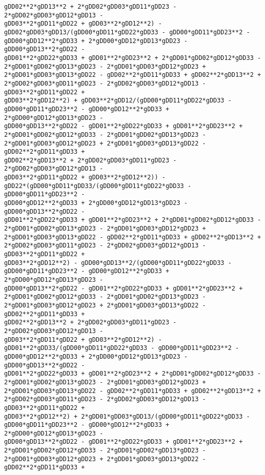 \documentclass[landscape,letterpaper,10pt,english]{article}
\begin{document}
\begin{Verbatim}[commandchars=\\\{\}]
gDD02**2*gDD13**2 + 2*gDD02*gDD03*gDD11*gDD23 - 2*gDD02*gDD03*gDD12*gDD13 -
gDD03**2*gDD11*gDD22 + gDD03**2*gDD12**2) -
gDD02*gDD03*gDD13/(gDD00*gDD11*gDD22*gDD33 - gDD00*gDD11*gDD23**2 -
gDD00*gDD12**2*gDD33 + 2*gDD00*gDD12*gDD13*gDD23 - gDD00*gDD13**2*gDD22 -
gDD01**2*gDD22*gDD33 + gDD01**2*gDD23**2 + 2*gDD01*gDD02*gDD12*gDD33 -
2*gDD01*gDD02*gDD13*gDD23 - 2*gDD01*gDD03*gDD12*gDD23 +
2*gDD01*gDD03*gDD13*gDD22 - gDD02**2*gDD11*gDD33 + gDD02**2*gDD13**2 +
2*gDD02*gDD03*gDD11*gDD23 - 2*gDD02*gDD03*gDD12*gDD13 - gDD03**2*gDD11*gDD22 +
gDD03**2*gDD12**2) + gDD03**2*gDD12/(gDD00*gDD11*gDD22*gDD33 -
gDD00*gDD11*gDD23**2 - gDD00*gDD12**2*gDD33 + 2*gDD00*gDD12*gDD13*gDD23 -
gDD00*gDD13**2*gDD22 - gDD01**2*gDD22*gDD33 + gDD01**2*gDD23**2 +
2*gDD01*gDD02*gDD12*gDD33 - 2*gDD01*gDD02*gDD13*gDD23 -
2*gDD01*gDD03*gDD12*gDD23 + 2*gDD01*gDD03*gDD13*gDD22 - gDD02**2*gDD11*gDD33 +
gDD02**2*gDD13**2 + 2*gDD02*gDD03*gDD11*gDD23 - 2*gDD02*gDD03*gDD12*gDD13 -
gDD03**2*gDD11*gDD22 + gDD03**2*gDD12**2)) -
gDD22*(gDD00*gDD11*gDD33/(gDD00*gDD11*gDD22*gDD33 - gDD00*gDD11*gDD23**2 -
gDD00*gDD12**2*gDD33 + 2*gDD00*gDD12*gDD13*gDD23 - gDD00*gDD13**2*gDD22 -
gDD01**2*gDD22*gDD33 + gDD01**2*gDD23**2 + 2*gDD01*gDD02*gDD12*gDD33 -
2*gDD01*gDD02*gDD13*gDD23 - 2*gDD01*gDD03*gDD12*gDD23 +
2*gDD01*gDD03*gDD13*gDD22 - gDD02**2*gDD11*gDD33 + gDD02**2*gDD13**2 +
2*gDD02*gDD03*gDD11*gDD23 - 2*gDD02*gDD03*gDD12*gDD13 - gDD03**2*gDD11*gDD22 +
gDD03**2*gDD12**2) - gDD00*gDD13**2/(gDD00*gDD11*gDD22*gDD33 -
gDD00*gDD11*gDD23**2 - gDD00*gDD12**2*gDD33 + 2*gDD00*gDD12*gDD13*gDD23 -
gDD00*gDD13**2*gDD22 - gDD01**2*gDD22*gDD33 + gDD01**2*gDD23**2 +
2*gDD01*gDD02*gDD12*gDD33 - 2*gDD01*gDD02*gDD13*gDD23 -
2*gDD01*gDD03*gDD12*gDD23 + 2*gDD01*gDD03*gDD13*gDD22 - gDD02**2*gDD11*gDD33 +
gDD02**2*gDD13**2 + 2*gDD02*gDD03*gDD11*gDD23 - 2*gDD02*gDD03*gDD12*gDD13 -
gDD03**2*gDD11*gDD22 + gDD03**2*gDD12**2) -
gDD01**2*gDD33/(gDD00*gDD11*gDD22*gDD33 - gDD00*gDD11*gDD23**2 -
gDD00*gDD12**2*gDD33 + 2*gDD00*gDD12*gDD13*gDD23 - gDD00*gDD13**2*gDD22 -
gDD01**2*gDD22*gDD33 + gDD01**2*gDD23**2 + 2*gDD01*gDD02*gDD12*gDD33 -
2*gDD01*gDD02*gDD13*gDD23 - 2*gDD01*gDD03*gDD12*gDD23 +
2*gDD01*gDD03*gDD13*gDD22 - gDD02**2*gDD11*gDD33 + gDD02**2*gDD13**2 +
2*gDD02*gDD03*gDD11*gDD23 - 2*gDD02*gDD03*gDD12*gDD13 - gDD03**2*gDD11*gDD22 +
gDD03**2*gDD12**2) + 2*gDD01*gDD03*gDD13/(gDD00*gDD11*gDD22*gDD33 -
gDD00*gDD11*gDD23**2 - gDD00*gDD12**2*gDD33 + 2*gDD00*gDD12*gDD13*gDD23 -
gDD00*gDD13**2*gDD22 - gDD01**2*gDD22*gDD33 + gDD01**2*gDD23**2 +
2*gDD01*gDD02*gDD12*gDD33 - 2*gDD01*gDD02*gDD13*gDD23 -
2*gDD01*gDD03*gDD12*gDD23 + 2*gDD01*gDD03*gDD13*gDD22 - gDD02**2*gDD11*gDD33 +

\end{Verbatim}
\end{document}
